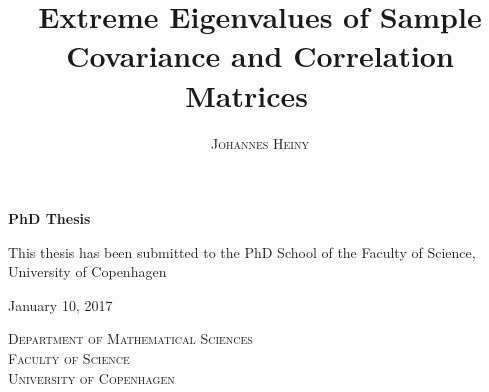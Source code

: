 

\title{\textbf{\HUGE Extreme Eigenvalues of Sample Covariance and Correlation Matrices \ \\ \vspace{1.5em}}}	
\author{\Huge \textsc{Johannes Heiny}}
\date{}
\maketitle
\thispagestyle{empty}
\begin{center}
\LARGE
\Huge\textbf{PhD Thesis}

\vspace{7em}
\LARGE
This thesis has been submitted to the PhD School of the Faculty of Science, University of Copenhagen

\vspace{2em}

January 10, 2017

\vspace{2em}

\textsc{Department of Mathematical Sciences \\ Faculty of Science \\ University of Copenhagen}
\end{center}
